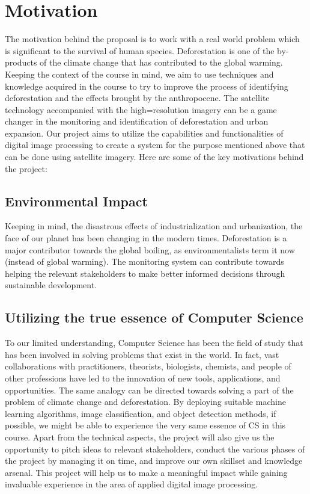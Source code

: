 \documentclass[12pt,a4paper]{article}
\begin{document}
\section{Motivation}
The motivation behind the proposal is to work with a real world problem which is significant to the survival of human species.
Deforestation is one of the by-products of the climate change that has contributed to the global warming. Keeping the context of
the course in mind, we aim to use techniques and knowledge acquired in the course to try to improve the process of identifying deforestation and the effects brought
by the anthropocene.
\newline The satellite technology accompanied with the high=resolution imagery can be a game changer in the monitoring and identification of deforestation and urban expansion.
\newline Our project aims to utilize the capabilities and functionalities of digital image processing to create a system for the purpose mentioned above that can be done using satellite imagery.
Here are some of the key motivations behind the project:
\subsection[2.1]{Environmental Impact}
Keeping in mind, the disastrous effects of industrialization and urbanization, the face of our planet has been changing in the modern times. Deforestation is a major contributor towards
the global boiling, as environmentalists term it now (instead of global warming). The monitoring system can contribute towards helping the relevant stakeholders to make better informed decisions through sustainable development.

\subsection[2.2]{Utilizing the true essence of Computer Science}
To our limited understanding, Computer Science has been the field of study that has been involved in solving problems that exist in the world. In fact, vast collaborations with practitioners, theorists, biologists, chemists, and people of other
professions have led to the innovation of new tools, applications, and opportunities. The same analogy can be directed towards solving a part of the problem of climate change and deforestation. By deploying suitable machine learning algorithms, image classification, and object detection methods, if possible,
we might be able to experience the very same essence of CS in this course.
\newline  
\newline Apart from the technical aspects, the project will also give us the opportunity to pitch ideas to relevant stakeholders, conduct the various phases of the project by managing it on time, and improve our own skillset and knowledge arsenal.
This project will help us to make a meaningful impact while gaining invaluable experience in the area of applied digital image processing.
\end{document}
